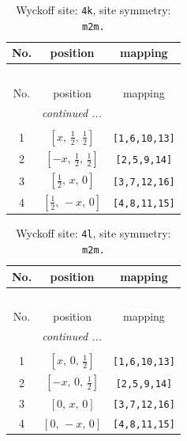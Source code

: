 \documentclass[fleqn,8pt]{jsarticle}
\begin{document}
\renewcommand{\arraystretch}{1.2}
\begin{longtable}{ccc}
\caption{Wyckoff site: {\tt 4k}, site symmetry: {\tt m2m.}}
 \\
 \hline \hline
No. & position & mapping \\ \hline \endfirsthead

\multicolumn{2}{l}{\tablename\ \thetable{}} \\
 \hline \hline
No. & position & mapping \\ \hline \endhead

 \hline \hline
\multicolumn{2}{r}{\footnotesize\it continued ...} \\ \endfoot

 \hline \hline
\multicolumn{2}{r}{} \\ \endlastfoot

1 & $\left[ x,\, \frac{1}{2},\, \frac{1}{2} \right]$ & {\tt [1,6,10,13]} \\ \hline
2 & $\left[ - x,\, \frac{1}{2},\, \frac{1}{2} \right]$ & {\tt [2,5,9,14]} \\ \hline
3 & $\left[ \frac{1}{2},\, x,\, 0 \right]$ & {\tt [3,7,12,16]} \\ \hline
4 & $\left[ \frac{1}{2},\, - x,\, 0 \right]$ & {\tt [4,8,11,15]} \\
\end{longtable}
\renewcommand{\arraystretch}{1.2}
\begin{longtable}{ccc}
\caption{Wyckoff site: {\tt 4l}, site symmetry: {\tt m2m.}}
 \\
 \hline \hline
No. & position & mapping \\ \hline \endfirsthead

\multicolumn{2}{l}{\tablename\ \thetable{}} \\
 \hline \hline
No. & position & mapping \\ \hline \endhead

 \hline \hline
\multicolumn{2}{r}{\footnotesize\it continued ...} \\ \endfoot

 \hline \hline
\multicolumn{2}{r}{} \\ \endlastfoot

1 & $\left[ x,\, 0,\, \frac{1}{2} \right]$ & {\tt [1,6,10,13]} \\ \hline
2 & $\left[ - x,\, 0,\, \frac{1}{2} \right]$ & {\tt [2,5,9,14]} \\ \hline
3 & $\left[ 0,\, x,\, 0 \right]$ & {\tt [3,7,12,16]} \\ \hline
4 & $\left[ 0,\, - x,\, 0 \right]$ & {\tt [4,8,11,15]} \\
\end{longtable}
\end{document}
